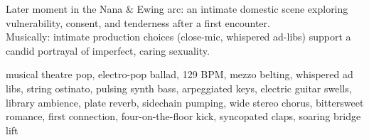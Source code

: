 

\begin{notes}
Later moment in the Nana \& Ewing arc: an intimate domestic scene exploring vulnerability, consent, and tenderness after a first encounter.\\
Musically: intimate production choices (close-mic, whispered ad-libs) support a candid portrayal of imperfect, caring sexuality.
\end{notes}

\begin{style}
musical theatre pop, electro-pop ballad, 129 BPM, mezzo belting, whispered ad libs, string ostinato, pulsing synth bass, arpeggiated keys, electric guitar swells, library ambience, plate reverb, sidechain pumping, wide stereo chorus, bittersweet romance, first connection, four-on-the-floor kick, syncopated claps, soaring bridge lift
\end{style}

